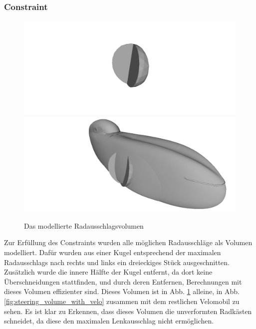 \subsubsection{Constraint}
\begin{figure}[h]
	\includegraphics[width=.5\linewidth]{bilder/radausschlag.png}
	\includegraphics[width=.5\linewidth]{bilder/radausschlag_inclVelo.png}
	\caption{Das modellierte Radausschlagsvolumen}
	\label{fig:steering_volume}
\end{figure}
Zur Erfüllung des Constraints wurden alle möglichen Radausschläge als Volumen modelliert.
Dafür wurden aus einer Kugel entsprechend der maximalen Radausschlags nach rechts und links ein dreieckiges Stück ausgeschnitten.
Zusätzlich wurde die innere Hälfte der Kugel entfernt, da dort keine Überschneidungen stattfinden, und durch deren Entfernen, Berechnungen mit dieses Volumen effizienter sind.
Dieses Volumen ist in Abb. \ref{fig:steering_volume} alleine, in Abb. \ref{fig:steering_volume_with_velo} zusammen mit dem restlichen Velomobil zu sehen.
Es ist klar zu Erkennen, dass dieses Volumen die unverformten Radkästen schneidet, da diese den maximalen Lenkausschlag nicht ermöglichen.
 

